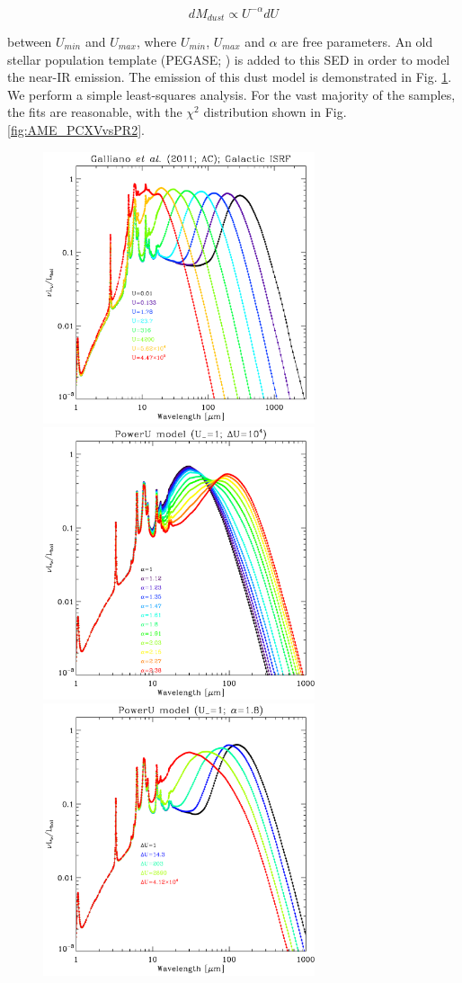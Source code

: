 \documentclass[preprint2,longabstract]{aastex}
\begin{document}
    \begin{equation}
        \label{eq:U}
          dM_{dust}\propto{} U^{-\alpha}dU
     \end{equation}

    between $U_{min}$ and $U_{max}$, where $U_{min}$, $U_{max}$ and $\alpha{}$ are free parameters. An old stellar population template (PEGASE; \citep{fioc97}) is added to this SED in order to model the near-IR emission. The emission of this dust model is demonstrated in Fig. \ref{fig:galliano11_templates}. We perform a simple least-squares analysis. For the vast majority of the samples, the fits are reasonable, with the $\chi{}^{2}$ distribution shown in Fig. \ref{fig:AME_PCXVvsPR2}.
\begin{figure}
  \label{fig:galliano11_templates}
  \includegraphics[width=80mm]{../Plots/template_deltaU_G11_AC.pdf}
  \includegraphics[width=80mm]{../Plots/template_powerU_alpha_G11_AC.pdf}
  \includegraphics[width=80mm]{../Plots/template_powerU_DU_G11_AC.pdf}

\end{figure}
\end{document}
